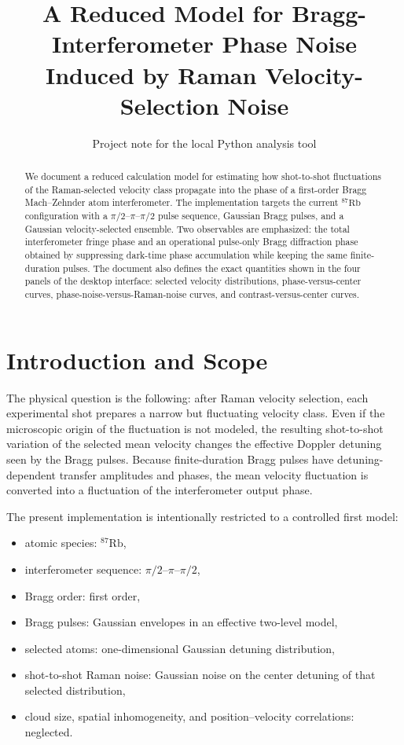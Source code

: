 \documentclass[11pt]{article}
\title{A Reduced Model for Bragg-Interferometer Phase Noise Induced by Raman Velocity-Selection Noise}
\author{Project note for the local Python analysis tool}
\date{}
\begin{document}
\maketitle

\begin{abstract}
We document a reduced calculation model for estimating how shot-to-shot fluctuations of the Raman-selected velocity class propagate into the phase of a first-order Bragg Mach--Zehnder atom interferometer. The implementation targets the current ${}^{87}\mathrm{Rb}$ configuration with a $\pi/2$--$\pi$--$\pi/2$ pulse sequence, Gaussian Bragg pulses, and a Gaussian velocity-selected ensemble. Two observables are emphasized: the total interferometer fringe phase and an operational pulse-only Bragg diffraction phase obtained by suppressing dark-time phase accumulation while keeping the same finite-duration pulses. The document also defines the exact quantities shown in the four panels of the desktop interface: selected velocity distributions, phase-versus-center curves, phase-noise-versus-Raman-noise curves, and contrast-versus-center curves.
\end{abstract}

\section{Introduction and Scope}
The physical question is the following: after Raman velocity selection, each experimental shot prepares a narrow but fluctuating velocity class. Even if the microscopic origin of the fluctuation is not modeled, the resulting shot-to-shot variation of the selected mean velocity changes the effective Doppler detuning seen by the Bragg pulses. Because finite-duration Bragg pulses have detuning-dependent transfer amplitudes and phases, the mean velocity fluctuation is converted into a fluctuation of the interferometer output phase.

The present implementation is intentionally restricted to a controlled first model:
\begin{itemize}[leftmargin=1.5em]
  \item atomic species: ${}^{87}\mathrm{Rb}$,
  \item interferometer sequence: $\pi/2$--$\pi$--$\pi/2$,
  \item Bragg order: first order,
  \item Bragg pulses: Gaussian envelopes in an effective two-level model,
  \item selected atoms: one-dimensional Gaussian detuning distribution,
  \item shot-to-shot Raman noise: Gaussian noise on the center detuning of that selected distribution,
  \item cloud size, spatial inhomogeneity, and position--velocity correlations: neglected.
\end{itemize}
\end{document}
